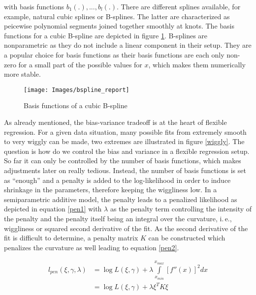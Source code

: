 \documentclass[12pt]{article}
\begin{document}
with basis functions $b_1(.), ..., b_l(.)$. There are different splines available, for example, natural cubic splines or B-splines. The latter are characterized as peicewise polynomial segments joined together smoothly at knots. The basis functions for a cubic B-spline are depicted in figure \ref{bsplines}. B-splines are nonparametric as they do not include a linear component in their setup. They are a popular choice for basis functions as their basis functions are each only non-zero for a small part of the possible values for $x$, which makes them numerically more stable.

\begin{figure}
\begin{center}
\texttt{[image: Images/bspline\_report]}
\end{center}
\vspace{-2em}
\caption[caption]{Basis functions of a cubic B-spline}\label{bsplines}
\end{figure}


As already mentioned, the bias-variance tradeoff is at the heart of flexible regression. For a given data situation, many possible fits from extremely smooth to very wiggly can be made, two extremes are illustrated in figure \ref{wiggly}. The question is how do we control the bias and variance in a flexible regression setup. So far it can only be controlled by the number of basis functions, which makes adjustments later on really tedious. Instead, the number of basis functions is set as ``enough'' and a penalty is added to the log-likelihood in order to induce shrinkage in the parameters, therefore keeping the wiggliness low. In a semiparametric additive model, the penalty leads to a penalized likelihood as depicted in equation \ref{pen1} with $\lambda$ as the penalty term controlling the intensity of the penalty and the penalty itself being an integral over the curvature, i.\,e., wiggliness or squared second derivative of the fit. As the second derivative of the fit is difficult to determine, a penalty matrix $K$ can be constructed which penalizes the curvature as well leading to equation \ref{pen2}. 

\begin{align}
l_{pen}(\xi,\gamma, \lambda) &=  \log L(\xi, \gamma) + \lambda \int\limits_{x_{min}}^{x_{max}} \left[ f''(x)\right]^2dx \label{pen1}\\
 &= \log L(\xi, \gamma) + \lambda \xi^T K \xi\label{pen2}
\end{align}
\end{document}
